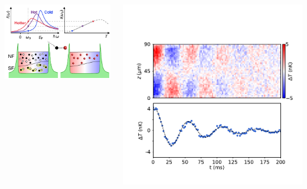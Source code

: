 \documentclass[26pt, paperwidth=36in,paperheight=48in]{tikzposter} %
\begin{document}
\begin{columns}
{\begin{minipage}{0.15\textwidth}
	\hspace{0.5cm}\includegraphics[width=10cm,
	trim=4.4cm 0cm 0cm 3.2cm,clip]{figures/local_thermometer.pdf}
\end{minipage}
\hspace{-2.5cm}
\begin{minipage}{0.2\textwidth}
	\vspace{-2cm}
	\includegraphics[width=17cm,
	trim=0cm 5.2cm 0cm 0cm,clip]{figures/TimeEvolution_Slides_noedge.pdf}\\

\end{minipage}}
\end{columns}
\end{document}
